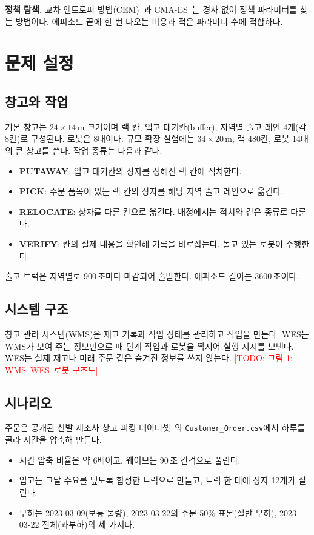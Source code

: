 \documentclass[10pt,twocolumn]{article}
\newcommand{\todo}[1]{\textcolor{red}{[TODO: #1]}}
\begin{document}
\textbf{정책 탐색.}
교차 엔트로피 방법(CEM)~\cite{rubinstein1999}과 CMA-ES~\cite{hansen2001}는 경사 없이 정책 파라미터를 찾는 방법이다.
에피소드 끝에 한 번 나오는 비용과 적은 파라미터 수에 적합하다.

\section{문제 설정}

\subsection{창고와 작업}
기본 창고는 $24\times14$\,m 크기이며 랙 칸, 입고 대기칸(buffer), 지역별 출고 레인 4개(각 8칸)로 구성된다. 로봇은 8대이다. %
규모 확장 실험에는 $34\times20$\,m, 랙 480칸, 로봇 14대의 큰 창고를 쓴다. %
작업 종류는 다음과 같다.
\begin{itemize}
  \item \textbf{PUTAWAY}: 입고 대기칸의 상자를 정해진 랙 칸에 적치한다.
  \item \textbf{PICK}: 주문 품목이 있는 랙 칸의 상자를 해당 지역 출고 레인으로 옮긴다.
  \item \textbf{RELOCATE}: 상자를 다른 칸으로 옮긴다. 배정에서는 적치와 같은 종류로 다룬다.
  \item \textbf{VERIFY}: 칸의 실제 내용을 확인해 기록을 바로잡는다. 놀고 있는 로봇이 수행한다.
\end{itemize}
출고 트럭은 지역별로 900\,초마다 마감되어 출발한다. %
에피소드 길이는 3600\,초이다.

\subsection{시스템 구조}
창고 관리 시스템(WMS)은 재고 기록과 작업 상태를 관리하고 작업을 만든다.
WES는 WMS가 보여 주는 정보만으로 매 단계 작업과 로봇을 짝지어 실행 지시를 보낸다.
WES는 실제 재고나 미래 주문 같은 숨겨진 정보를 쓰지 않는다.
\todo{그림 1: WMS--WES--로봇 구조도}

\subsection{시나리오}
주문은 공개된 신발 제조사 창고 피킹 데이터셋~\cite{assis2023}의 \texttt{Customer\_Order.csv}에서 하루를 골라 시간을 압축해 만든다.
\begin{itemize}
  \item 시간 압축 비율은 약 6배이고, 웨이브는 90\,초 간격으로 풀린다. %
  \item 입고는 그날 수요를 덮도록 합성한 트럭으로 만들고, 트럭 한 대에 상자 12개가 실린다.
  \item 부하는 2023-03-09(보통 물량), 2023-03-22의 주문 50\% 표본(절반 부하), 2023-03-22 전체(과부하)의 세 가지다.
\end{itemize}
\end{document}
